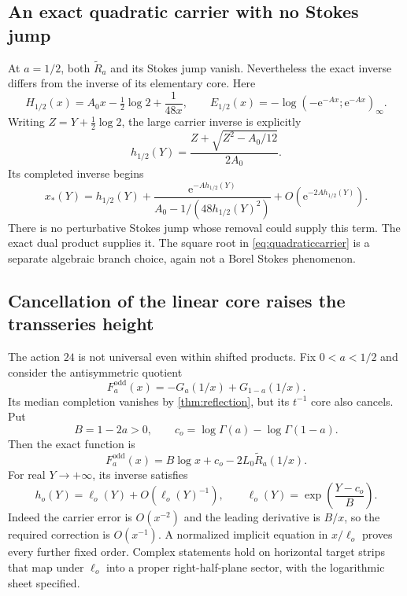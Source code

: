 \documentclass[11pt,a4paper]{article}
\numberwithin{equation}{section}
\theoremstyle{definition}
\theoremstyle{remark}
\newcommand{\e}{\mathrm e}
\newcommand{\wt}{\widetilde}
\begin{document}
\subsection{An exact quadratic carrier with no Stokes jump}
At $a=1/2$, both $\wt R_a$ and its Stokes jump vanish. Nevertheless the
exact inverse differs from the inverse of its elementary core. Here
\[
 H_{1/2}(x)=A_0x-\tfrac12\log2+\frac1{48x},\qquad
 E_{1/2}(x)=-\log(-\e^{-Ax};\e^{-Ax})_\infty.
\]
Writing $Z=Y+\frac12\log2$, the large carrier inverse is explicitly
\begin{equation}
 h_{1/2}(Y)=\frac{Z+\sqrt{Z^2-A_0/12}}{2A_0}.
 \label{eq:quadraticcarrier}
\end{equation}
Its completed inverse begins
\begin{equation}
 x_*(Y)=h_{1/2}(Y)
 +\frac{\e^{-Ah_{1/2}(Y)}}{A_0-1/(48h_{1/2}(Y)^2)}
 +O(\e^{-2Ah_{1/2}(Y)}).
 \label{eq:halfcompletedinverse}
\end{equation}
There is no perturbative Stokes jump whose removal could supply this
term. The exact dual product supplies it. The square root in
\eqref{eq:quadraticcarrier} is a separate algebraic branch choice,
again not a Borel Stokes phenomenon.

\subsection{Cancellation of the linear core raises the transseries height}
The action $24$ is not universal even within shifted products. Fix
$0<a<1/2$ and consider the antisymmetric quotient
\begin{equation}
 F^{\mathrm{odd}}_a(x)=-G_a(1/x)+G_{1-a}(1/x).
 \label{eq:oddforward}
\end{equation}
Its median completion vanishes by \cref{thm:reflection}, but its
$t^{-1}$ core also cancels. Put
\[
 B=1-2a>0,\qquad c_o=\log\Gamma(a)-\log\Gamma(1-a).
\]
Then the exact function is
\begin{equation}
 F^{\mathrm{odd}}_a(x)=B\log x+c_o-2L_0\wt R_a(1/x).
 \label{eq:oddcore}
\end{equation}
For real $Y\to+\infty$, its inverse satisfies
\begin{equation}
 h_o(Y)=\ell_o(Y)+O(\ell_o(Y)^{-1}),\qquad
 \ell_o(Y)=\exp\!\left(\frac{Y-c_o}{B}\right).
 \label{eq:oddinverse}
\end{equation}
Indeed the carrier error is $O(x^{-2})$ and the leading derivative is
$B/x$, so the required correction is $O(x^{-1})$. A normalized
implicit equation in $x/\ell_o$ proves every further fixed order.
Complex statements hold on horizontal target strips that map under
$\ell_o$ into a proper right-half-plane sector, with the logarithmic
sheet specified.
\end{document}
